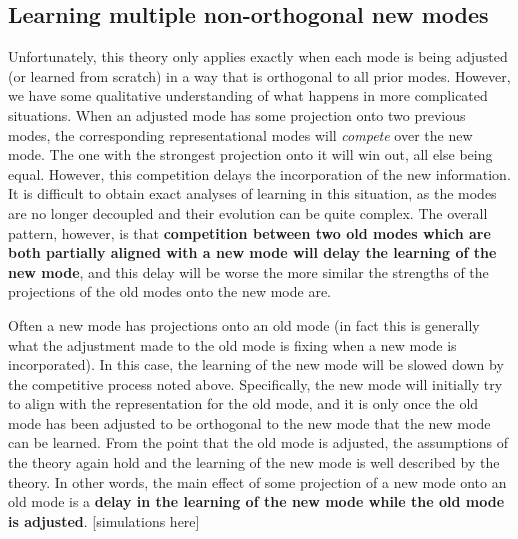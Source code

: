 \documentclass{article}
\begin{document}
\subsection{Learning multiple non-orthogonal new modes}
Unfortunately, this theory only applies exactly when each mode is being adjusted (or learned from scratch) in a way that is orthogonal to all prior modes. However, we have some qualitative understanding of what happens in more complicated situations. When an adjusted mode has some projection onto two previous modes, the corresponding representational modes will \emph{compete} over the new mode. The one with the strongest projection onto it will win out, all else being equal. However, this competition delays the incorporation of the new information. It is difficult to obtain exact analyses of learning in this situation, as the modes are no longer decoupled and their evolution can be quite complex. The overall pattern, however, is that \textbf{competition between two old modes which are both partially aligned with a new mode will delay the learning of the new mode}, and this delay will be worse the more similar the strengths of the projections of the old modes onto the new mode are.\par
Often a new mode has projections onto an old mode (in fact this is generally what the adjustment made to the old mode is fixing when a new mode is incorporated). In this case, the learning of the new mode will be slowed down by the competitive process noted above. Specifically, the new mode will initially try to align with the representation for the old mode, and it is only once the old mode has been adjusted to be orthogonal to the new mode that the new mode can be learned. From the point that the old mode is adjusted, the assumptions of the theory again hold and the learning of the new mode is well described by the theory. In other words, the main effect of some projection of a new mode onto an old mode is a \textbf{delay in the learning of the new mode while the old mode is adjusted}. {\color{red}[simulations here]}
\end{document}
